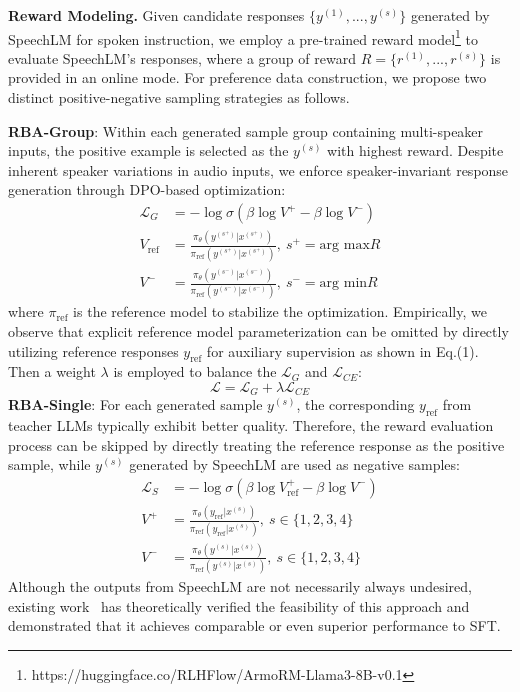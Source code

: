 \documentclass[letterpaper]{article} %
\begin{document}
\noindent \textbf{Reward Modeling.} 
Given candidate responses $\{y^{(1)},...,y^{(s)}\}$ generated by SpeechLM for spoken instruction, we employ a pre-trained reward model\footnote{https://huggingface.co/RLHFlow/ArmoRM-Llama3-8B-v0.1} to evaluate SpeechLM's responses, where a group of reward $R = \{r^{(1)},...,r^{(s)}\}$ is provided in an online mode. For preference data construction, we propose two distinct positive-negative sampling strategies as follows. \par
\noindent \textbf{RBA-Group}: Within each generated sample group containing multi-speaker inputs, the positive example is selected as the $y^{(s)}$ with highest reward. Despite inherent speaker variations in audio inputs, we enforce speaker-invariant response generation through DPO-based optimization:
\begin{align}
\mathcal{L}_G &= -\log\sigma(\beta\log V^+ - \beta\log  V^-) \\ 
V_{\text{ref}} &= \frac{\pi_{\theta}(y^{(s^+)}|x^{(s^+)})}{\pi_\mathrm{ref}(y^{(s^+)}|x^{(s^+)})}, \ s^+ = \text{arg max} R \\
V^- &= \frac{\pi_{\theta}(y^{(s^-)}|x^{(s^-)})}{\pi_\mathrm{ref}(y^{(s^-)}|x^{(s^-)})}, \ s^- = \text{arg min} R 
\end{align}
where $\pi_\mathrm{ref}$ is the reference model to stabilize the optimization. Empirically, we observe that explicit reference model parameterization can be omitted by directly utilizing reference responses $y_\mathrm{ref}$ for auxiliary supervision as shown in Eq.(1). Then a weight $\lambda$ is employed to balance the $\mathcal{L}_G$ and $\mathcal{L}_{CE}$:
\begin{equation}
    \mathcal{L} = \mathcal{L}_{G} + \lambda \mathcal{L}_{CE} 
\end{equation}    
\noindent \textbf{RBA-Single}: For each generated sample $y^{(s)}$, the corresponding $y_{\mathrm{ref}}$ from teacher LLMs typically exhibit better quality. Therefore, the reward evaluation process can be skipped by directly treating the reference response as the positive sample, while ${y^{(s)}}$ generated by SpeechLM are used as negative samples:
\begin{align}
\mathcal{L}_S &= -\log\sigma(\beta\log V^+_{\text{ref}} - \beta\log  V^-) \\ 
V^+ &= \frac{\pi_{\theta}(y_{\text{ref}}|x^{(s)})}{\pi_\mathrm{ref}(y_{\text{ref}}|x^{(s)})}, \ s\in \{1,2,3,4\} \\
V^- &= \frac{\pi_{\theta}(y^{(s)}|x^{(s)})}{\pi_\mathrm{ref}(y^{(s)}|x^{(s)})}, \ s\in \{1,2,3,4\}
\end{align}
Although the outputs from SpeechLM are not necessarily always undesired, existing work~\cite{chen2024self} has theoretically verified the feasibility of this approach and demonstrated that it achieves comparable or even superior performance to SFT. 
\end{document}
